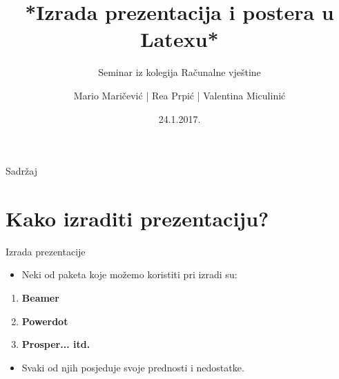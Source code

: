 \documentclass{beamer}
\begin{document}
\author[Maričević,Prpić,Miculinić]{Mario Maričević | Rea Prpić | Valentina Miculinić}
\title{*Izrada prezentacija i postera u Latexu*}
\subtitle{Seminar iz kolegija Računalne vještine}
\date{24.1.2017.}
\frame{\titlepage}
\begin{frame}{Sadržaj}
\tableofcontents
\end{frame}

\section{Kako izraditi prezentaciju?}
\begin{frame}{Izrada prezentacije}
\begin{itemize}
	\item Neki od paketa koje možemo koristiti pri izradi su:
\end{itemize}
\begin{enumerate}
	\item \textbf{Beamer} 
	\item \textbf{Powerdot} 
	\item \textbf{Prosper... itd.}
\end{enumerate}
\begin{itemize}
	\item Svaki od njih posjeduje svoje prednosti i nedostatke.
\end{itemize}
\end{frame}
\end{document}
